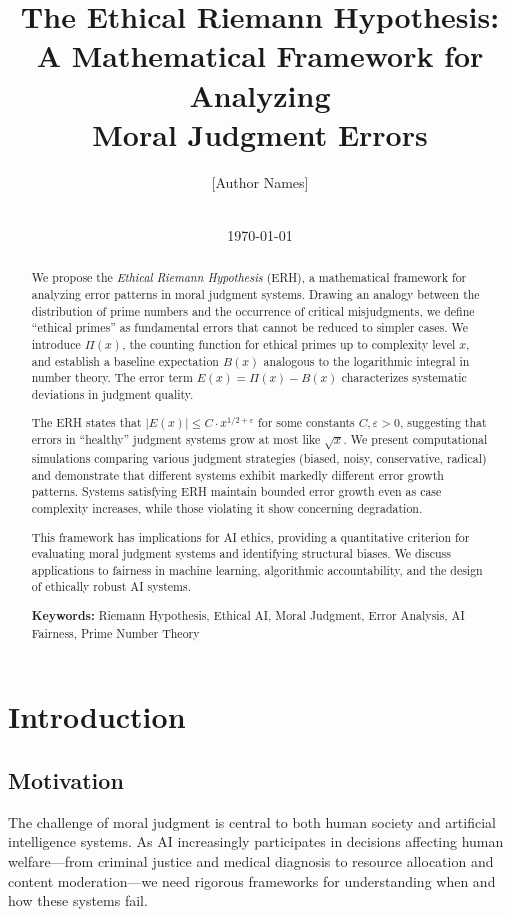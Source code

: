 \documentclass[12pt,a4paper]{article}
\title{The Ethical Riemann Hypothesis:\\
       A Mathematical Framework for Analyzing\\
       Moral Judgment Errors}
\author{
  [Author Names]\\
  [Institution]\\
  [Email]
}
\date{\today}
\theoremstyle{definition}
\theoremstyle{remark}
\begin{document}
\maketitle

\begin{abstract}
We propose the \emph{Ethical Riemann Hypothesis} (ERH), a mathematical framework for analyzing error patterns in moral judgment systems. Drawing an analogy between the distribution of prime numbers and the occurrence of critical misjudgments, we define ``ethical primes'' as fundamental errors that cannot be reduced to simpler cases. We introduce $\Pi(x)$, the counting function for ethical primes up to complexity level $x$, and establish a baseline expectation $B(x)$ analogous to the logarithmic integral in number theory. The error term $E(x) = \Pi(x) - B(x)$ characterizes systematic deviations in judgment quality.

The ERH states that $|E(x)| \leq C \cdot x^{1/2 + \varepsilon}$ for some constants $C, \varepsilon > 0$, suggesting that errors in ``healthy'' judgment systems grow at most like $\sqrt{x}$. We present computational simulations comparing various judgment strategies (biased, noisy, conservative, radical) and demonstrate that different systems exhibit markedly different error growth patterns. Systems satisfying ERH maintain bounded error growth even as case complexity increases, while those violating it show concerning degradation.

This framework has implications for AI ethics, providing a quantitative criterion for evaluating moral judgment systems and identifying structural biases. We discuss applications to fairness in machine learning, algorithmic accountability, and the design of ethically robust AI systems.

\textbf{Keywords:} Riemann Hypothesis, Ethical AI, Moral Judgment, Error Analysis, AI Fairness, Prime Number Theory
\end{abstract}

\section{Introduction}
\label{sec:introduction}

\subsection{Motivation}

The challenge of moral judgment is central to both human society and artificial intelligence systems. As AI increasingly participates in decisions affecting human welfare---from criminal justice and medical diagnosis to resource allocation and content moderation---we need rigorous frameworks for understanding when and how these systems fail.
\end{document}
